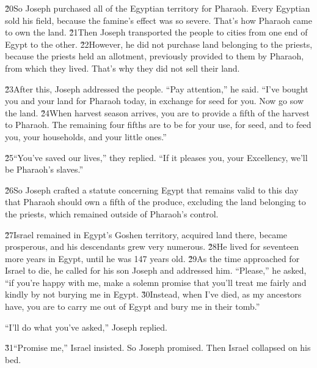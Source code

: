 \v{20}So Joseph purchased all of the Egyptian territory for Pharaoh. Every Egyptian sold his field, because the famine's effect was so severe. That's how Pharaoh came to own the land. \v{21}Then Joseph transported the people to cities from one end of Egypt to the other. \v{22}However, he did not purchase land belonging to the priests, because the priests held an allotment, previously provided to them by Pharaoh, from which they lived. That's why they did not sell their land.

\v{23}After this, Joseph addressed the people. ``Pay attention,'' he said. ``I've bought you and your land for Pharaoh today, in exchange for seed for you. Now go sow the land. \v{24}When harvest season arrives, you are to provide a fifth of the harvest to Pharaoh. The remaining four fifths are to be for your use, for seed, and to feed you, your households, and your little ones.''

\v{25}``You've saved our lives,'' they replied. ``If it pleases you, your Excellency, we'll be Pharaoh's slaves.''

\v{26}So Joseph crafted a statute concerning Egypt that remains valid to this day that Pharaoh should own a fifth of the produce, excluding the land belonging to the priests, which remained outside of Pharaoh's control.

\v{27}Israel remained in Egypt's Goshen territory, acquired land there, became prosperous, and his descendants grew very numerous. \v{28}He lived for seventeen more years in Egypt, until he was 147 years old. \v{29}As the time approached for Israel to die, he called for his son Joseph and addressed him. ``Please,'' he asked, ``if you're happy with me, make a solemn promise that you'll treat me fairly and kindly by not burying me in Egypt. \v{30}Instead, when I've died, as my ancestors have, you are to carry me out of Egypt and bury me in their tomb.''

``I'll do what you've asked,'' Joseph replied.

\v{31}``Promise me,'' Israel insisted. So Joseph promised. Then Israel collapsed on his bed.


